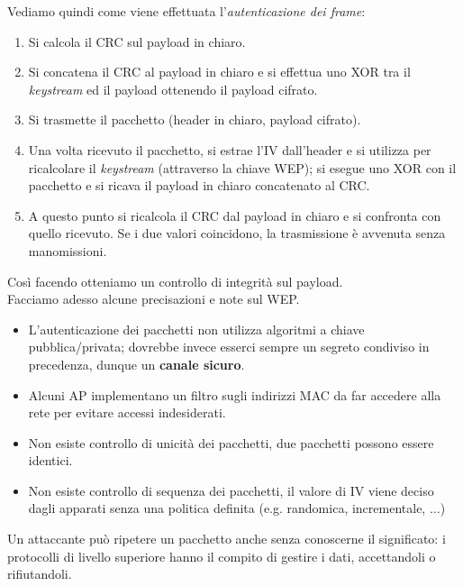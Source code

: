\newpage
Vediamo quindi come viene effettuata l'\textit{autenticazione dei frame}:
\begin{enumerate}
	\item Si calcola il CRC sul payload in chiaro.
	\item Si concatena il CRC al payload in chiaro e si effettua uno XOR tra il \textit{keystream} ed il payload ottenendo il payload cifrato.
	\item Si trasmette il pacchetto (header in chiaro, payload cifrato).
	\item Una volta ricevuto il pacchetto, si estrae l'IV dall'header e si utilizza per ricalcolare il \textit{keystream} (attraverso la chiave WEP); si esegue uno XOR con il pacchetto e si ricava il payload in chiaro concatenato al CRC.
	\item A questo punto si ricalcola il CRC dal payload in chiaro e si confronta con quello ricevuto. Se i due valori coincidono, la trasmissione è avvenuta senza manomissioni.
\end{enumerate}
Così facendo otteniamo un controllo di integrità sul payload.\\

Facciamo adesso alcune precisazioni e note sul WEP.
\begin{itemize}
\item L'autenticazione dei pacchetti non utilizza algoritmi a chiave pubblica/privata; dovrebbe invece esserci sempre un segreto condiviso in precedenza, dunque un \textbf{canale sicuro}. 
\item Alcuni AP implementano un filtro sugli indirizzi MAC da far accedere alla rete per evitare accessi indesiderati.
\item Non esiste controllo di unicità dei pacchetti, due pacchetti possono essere identici.
\item Non esiste controllo di sequenza dei pacchetti, il valore di IV viene deciso dagli apparati senza una politica definita (e.g. randomica, incrementale, $\dots$)
\end{itemize}
Un attaccante può ripetere un pacchetto anche senza conoscerne il significato: i protocolli di livello superiore hanno il compito di gestire i dati, accettandoli o rifiutandoli.\\

